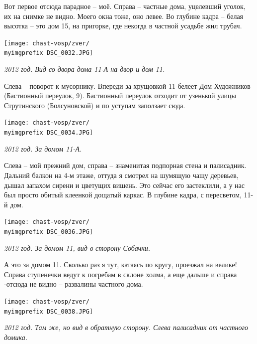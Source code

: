 Вот первое отсюда парадное – моё. Справа – частные дома, уцелевший уголок, их на снимке не видно. Моего окна тоже, оно левее. Во глубине кадра – белая высотка – это дом 15, на пригорке, где некогда в частной усадьбе жил трубач.  

\newpage

\begin{center}
\texttt{[image: chast-vosp/zver/\\myimgprefix DSC\_0032.JPG]}

\textit{2012 год. Вид со двора дома 11-А на двор и дом 11.}
\end{center}

Слева – поворот к мусорнику. Впереди за хрущовкой 11 белеет Дом Художников (Бастионный переулок, 9). Бастионный переулок отходит от узенькой улицы Струтинского (Болсуновской) и по уступам заползает сюда.

\newpage

\begin{center}
\texttt{[image: chast-vosp/zver/\\myimgprefix DSC\_0034.JPG]}

\textit{2012 год. За домом 11-А.}
\end{center}

Слева – мой прежний дом, справа – знаменитая подпорная стена и палисадник. Дальний балкон на 4-м этаже, оттуда я смотрел на шумящую чащу деревьев, дышал запахом сирени и цветущих вишень. Это сейчас его застеклили, а у нас был просто обитый клеенкой дощатый каркас. В глубине кадра, с пересветом, 11-й дом.

\newpage

\begin{center}
\texttt{[image: chast-vosp/zver/\\myimgprefix DSC\_0036.JPG]}

\textit{2012 год. За домом 11, вид в сторону Собачки.}
\end{center}

А это за домом 11. Сколько раз я тут, катаясь по кругу, проезжал на велике! Справа ступенечки ведут к погребам в склоне холма, а еще дальше и справа -отсюда не видно – развалины частного дома.

\newpage

\begin{center}
\texttt{[image: chast-vosp/zver/\\myimgprefix DSC\_0038.JPG]}

\textit{2012 год. Там же, но вид в обратную сторону. Слева палисадник от частного домика.}
\end{center}

